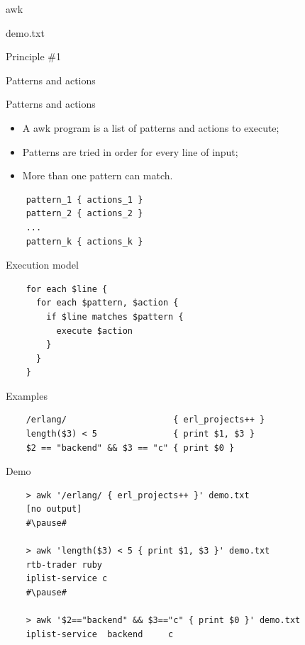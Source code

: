\documentclass{beamer}
\renewcommand\big[1]{
  \begin{center}
    \Large{#1}
  \end{center}
}
\begin{document}
\begin{frame}
  \centering\Huge{awk}
\end{frame}

\begin{frame}
  \big{demo.txt}
  
\end{frame}

\begin{frame}
  \centering\Huge{Principle \#1}
  \big{Patterns and actions}
\end{frame}

\begin{frame}[fragile]
  \big{Patterns and actions}

  \begin{itemize}
    \item A awk program is a list of patterns and actions to execute;
    \item Patterns are tried in order for every line of input;
    \item More than one pattern can match.
  \end{itemize}

  \begin{lstlisting}
    pattern_1 { actions_1 }
    pattern_2 { actions_2 }
    ...
    pattern_k { actions_k }
  \end{lstlisting}
\end{frame}

\begin{frame}[fragile]
  \big{Execution model}

  \begin{lstlisting}
    for each $line {
      for each $pattern, $action {
        if $line matches $pattern {
          execute $action
        }
      }
    }
  \end{lstlisting}
\end{frame}

\begin{frame}[fragile]
  \big{Examples}
  \begin{lstlisting}
    /erlang/                     { erl_projects++ }
    length($3) < 5               { print $1, $3 }
    $2 == "backend" && $3 == "c" { print $0 }
  \end{lstlisting}
\end{frame}

\begin{frame}[fragile]
  \big{Demo}
  \begin{lstlisting}
    > awk '/erlang/ { erl_projects++ }' demo.txt
    [no output]
    #\pause#

    > awk 'length($3) < 5 { print $1, $3 }' demo.txt
    rtb-trader ruby
    iplist-service c
    #\pause#

    > awk '$2=="backend" && $3=="c" { print $0 }' demo.txt
    iplist-service  backend     c
  \end{lstlisting}
\end{frame}
\end{document}
